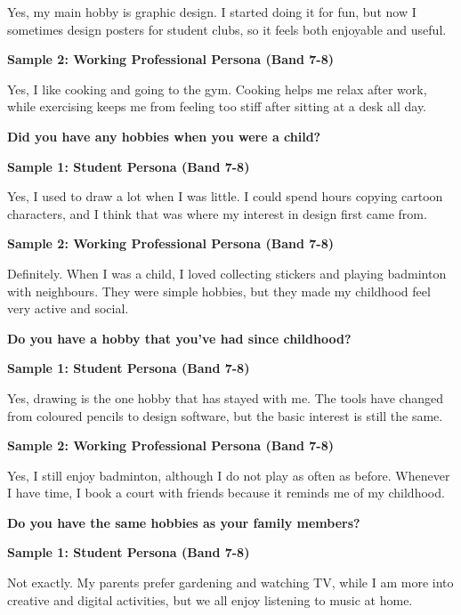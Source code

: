 Yes, my main hobby is graphic design. I started doing it for fun, but now I sometimes design posters for student clubs, so it feels both enjoyable and useful.

\textbf{Sample 2: Working Professional Persona (Band 7-8)}

Yes, I like cooking and going to the gym. Cooking helps me relax after work, while exercising keeps me from feeling too stiff after sitting at a desk all day.

\separator

\begin{ieltsquestion}
\textbf{Did you have any hobbies when you were a child?}
\end{ieltsquestion}
\textbf{Sample 1: Student Persona (Band 7-8)}

Yes, I used to draw a lot when I was little. I could spend hours copying cartoon characters, and I think that was where my interest in design first came from.

\textbf{Sample 2: Working Professional Persona (Band 7-8)}

Definitely. When I was a child, I loved collecting stickers and playing badminton with neighbours. They were simple hobbies, but they made my childhood feel very active and social.

\separator

\begin{ieltsquestion}
\textbf{Do you have a hobby that you've had since childhood?}
\end{ieltsquestion}
\textbf{Sample 1: Student Persona (Band 7-8)}

Yes, drawing is the one hobby that has stayed with me. The tools have changed from coloured pencils to design software, but the basic interest is still the same.

\textbf{Sample 2: Working Professional Persona (Band 7-8)}

Yes, I still enjoy badminton, although I do not play as often as before. Whenever I have time, I book a court with friends because it reminds me of my childhood.

\separator

\begin{ieltsquestion}
\textbf{Do you have the same hobbies as your family members?}
\end{ieltsquestion}
\textbf{Sample 1: Student Persona (Band 7-8)}

Not exactly. My parents prefer gardening and watching TV, while I am more into creative and digital activities, but we all enjoy listening to music at home.

